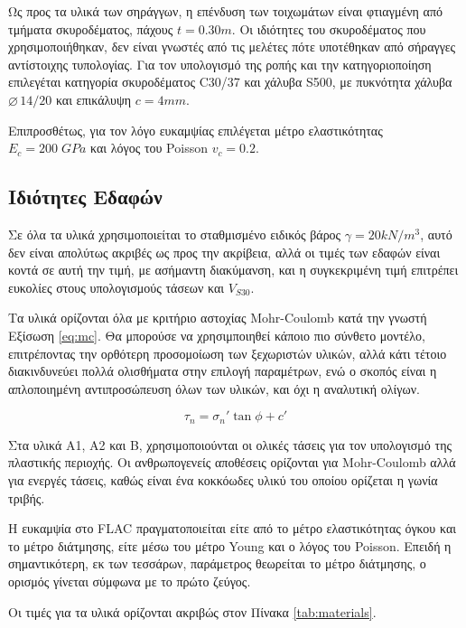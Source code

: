 Ως προς τα υλικά των σηράγγων, η επένδυση των τοιχωμάτων είναι φτιαγμένη από τμήματα σκυροδέματος, πάχους $t=0.30m$. Οι ιδιότητες του σκυροδέματος που χρησιμοποιήθηκαν, δεν είναι γνωστές από τις μελέτες πότε υποτέθηκαν από σήραγγες αντίστοιχης τυπολογίας. Για τον υπολογισμό της ροπής και την κατηγοριοποίηση επιλεγέται κατηγορία σκυροδέματος C30/37 και χάλυβα S500, με πυκνότητα χάλυβα $\diameter\,14/20$ και επικάλυψη $c=4mm$.

Επιπροσθέτως, για τον λόγο ευκαμψίας επιλέγεται μέτρο ελαστικότητας $E_c = 200\;GPa$ και λόγος του Poisson $v_c = 0.2$.

\subsection{Ιδιότητες Εδαφών}

Σε όλα τα υλικά χρησιμοποιείται το σταθμισμένο ειδικός βάρος $\gamma = 20 kN/m^3$, αυτό δεν είναι απολύτως ακριβές ως προς την ακρίβεια, αλλά οι τιμές των εδαφών είναι κοντά σε αυτή την τιμή, με ασήμαντη διακύμανση, και η συγκεκριμένη τιμή επιτρέπει ευκολίες στους υπολογισμούς τάσεων και $V_{S30}$.

Τα υλικά ορίζονται όλα με κριτήριο αστοχίας Mohr-Coulomb κατά την γνωστή Εξίσωση \ref{eq:mc}. Θα μπορούσε να χρησιμποιηθεί κάποιο πιο σύνθετο μοντέλο, επιτρέποντας την ορθότερη προσομοίωση των ξεχωριστών υλικών, αλλά κάτι τέτοιο διακινδυνεύει πολλά ολισθήματα στην επιλογή παραμέτρων, ενώ ο σκοπός είναι η απλοποιημένη αντιπροσώπευση όλων των υλικών, και όχι η αναλυτική ολίγων.

\begin{equation}
	\tau_n = \sigma_n' \tan{\phi} + c'
	\label{eq:mc}
\end{equation}

Στα υλικά A1, A2 και B, χρησιμοποιούνται οι ολικές τάσεις για τον υπολογισμό της πλαστικής περιοχής. Οι ανθρωπογενείς αποθέσεις ορίζονται για Mohr-Coulomb αλλά για ενεργές τάσεις, καθώς είναι ένα κοκκόωδες υλικύ του οποίου ορίζεται η γωνία τριβής.

Η ευκαμψία στο FLAC πραγματοποιείται είτε από το μέτρο ελαστικότητας όγκου και το μέτρο διάτμησης, είτε μέσω του μέτρο Young και ο λόγος του Poisson. Επειδή η σημαντικότερη, εκ των τεσσάρων, παράμετρος θεωρείται το μέτρο διάτμησης, ο ορισμός γίνεται σύμφωνα με το πρώτο ζεύγος.

Οι τιμές για τα υλικά ορίζονται ακριβώς στον Πίνακα \ref{tab:materials}.

